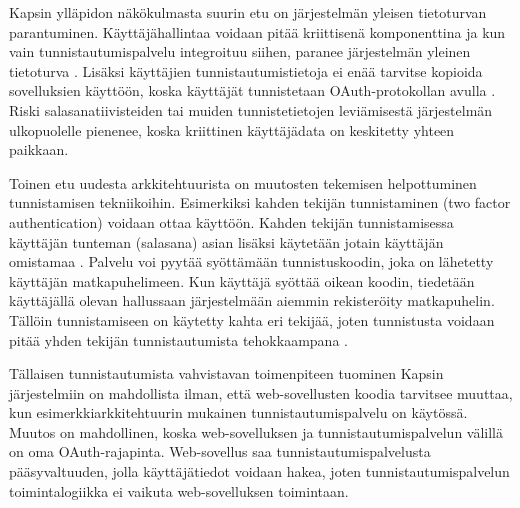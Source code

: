 Kapsin ylläpidon näkökulmasta suurin etu on järjestelmän yleisen tietoturvan parantuminen. Käyttäjähallintaa voidaan pitää kriittisenä komponenttina ja kun vain tunnistautumispalvelu integroituu siihen, paranee järjestelmän yleinen tietoturva \cite{arkkitehtuurit}. Lisäksi käyttäjien tunnistautumistietoja ei enää tarvitse kopioida sovelluksien käyttöön, koska käyttäjät tunnistetaan OAuth-protokollan avulla \cite{oauth2_0}. Riski salasanatiivisteiden tai muiden tunnistetietojen leviämisestä järjestelmän ulkopuolelle pienenee, koska kriittinen käyttäjädata on keskitetty yhteen paikkaan.

Toinen etu uudesta arkkitehtuurista on muutosten tekemisen helpottuminen tunnistamisen tekniikoihin. Esimerkiksi kahden tekijän tunnistaminen (two factor authentication) voidaan ottaa käyttöön. Kahden tekijän tunnistamisessa käyttäjän tunteman (salasana) asian lisäksi käytetään jotain käyttäjän omistamaa \cite{nisti}. Palvelu voi pyytää syöttämään tunnistuskoodin, joka on lähetetty käyttäjän matkapuhelimeen. Kun käyttäjä syöttää oikean koodin, tiedetään käyttäjällä olevan hallussaan järjestelmään aiemmin rekisteröity matkapuhelin. Tällöin tunnistamiseen on käytetty kahta eri tekijää, joten tunnistusta voidaan pitää yhden tekijän tunnistautumista tehokkaampana \cite{nisti}.

Tällaisen tunnistautumista vahvistavan toimenpiteen tuominen Kapsin järjestelmiin on mahdollista ilman, että web-sovellusten koodia tarvitsee muuttaa, kun esimerkkiarkkitehtuurin mukainen tunnistautumispalvelu on käytössä. Muutos on mahdollinen, koska web-sovelluksen ja tunnistautumispalvelun välillä on oma OAuth-rajapinta. Web-sovellus saa tunnistautumispalvelusta pääsyvaltuuden, jolla käyttäjätiedot voidaan hakea, joten tunnistautumispalvelun toimintalogiikka ei vaikuta web-sovelluksen toimintaan.